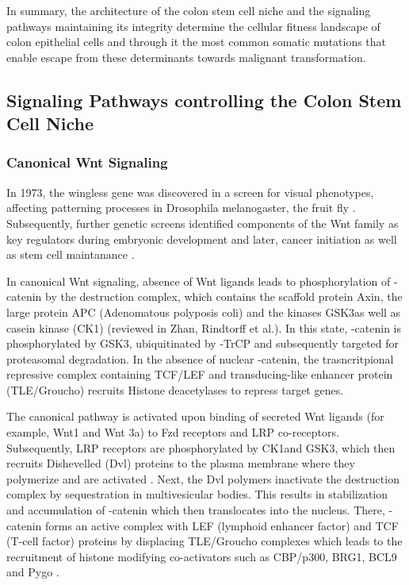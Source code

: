 \begin{flushleft}
In summary, the architecture of the colon stem cell niche and the signaling pathways maintaining its integrity determine the cellular fitness landscape of colon epithelial cells and through it the most common somatic mutations that enable escape from these determinants towards malignant transformation.

\subsection{Signaling Pathways controlling the Colon Stem Cell Niche}
\subsubsection{Canonical Wnt Signaling}
In 1973, the wingless gene was discovered in a screen for visual phenotypes, affecting patterning processes in Drosophila melanogaster, the fruit fly \cite{Sharma1973WinglessMelanogaster.}. Subsequently, further genetic screens identified components of the Wnt family as key regulators during embryonic development and later, cancer initiation as well as stem cell maintanance  \cite{Nusslein-Volhard1980MutationsDrosophila}. \par 

In canonical Wnt signaling, absence of Wnt ligands leads to phosphorylation of \textbeta-catenin by the destruction complex, which contains the scaffold protein Axin, the large protein APC (Adenomatous polyposis coli) and the kinases GSK3\textbeta as well as casein kinase (CK1\textalpha) (reviewed in Zhan, Rindtorff et al.\cite{Zhan2017}). 
In this state, \textbeta-catenin is phosphorylated by GSK3\textbeta, ubiquitinated by \textbeta-TrCP and subsequently targeted for proteasomal degradation. 
In the absence of nuclear \textbeta-catenin, the trasncritpional repressive complex containing TCF/LEF and transducing-like enhancer protein (TLE/Groucho) recruits Histone deacetylases to repress target genes. \par 

The canonical pathway is activated upon binding of secreted Wnt ligands (for example, Wnt1 and Wnt 3a) to Fzd receptors and LRP co-receptors. 
Subsequently, LRP receptors are  phosphorylated by CK1\textalpha and GSK3\textbeta, which then recruits Dishevelled (Dvl) proteins to the plasma membrane where they polymerize and are activated \cite{Metcalfe2011}. Next, the Dvl polymers inactivate the destruction complex by sequestration in multivesicular bodies. This results in stabilization and accumulation of \textbeta-catenin which then translocates into the nucleus. There, \textbeta-catenin forms an active complex with LEF (lymphoid enhancer factor) and TCF (T-cell factor) proteins by displacing TLE/Groucho complexes which leads to the recruitment of histone modifying co-activators such as CBP/p300, BRG1, BCL9 and Pygo \cite{Lien2014WntSignaling}. \par 


\end{flushleft}
